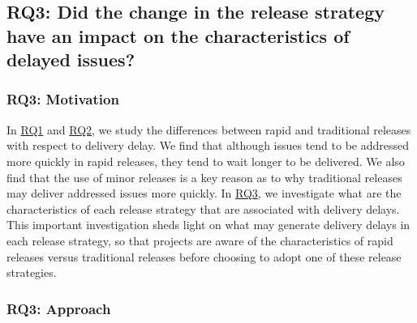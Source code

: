 
\subsection{RQ3: Did the change in the release strategy have an impact on
the characteristics of delayed issues?}\label{ch5:rq3} 

\subsubsection*{RQ3: Motivation}

In \hyperref[ch5:rq1]{RQ1} and \hyperref[ch5:rq2]{RQ2}, we study the differences
between rapid and traditional releases with respect to delivery delay. We find
that although issues tend to be addressed more quickly in rapid releases, they
tend to wait longer to be delivered. We also find that the use of minor releases
is a key reason as to why traditional releases may deliver addressed issues more
quickly. In \hyperref[ch4:rq3]{RQ3}, we investigate what are the characteristics
of each release strategy that are associated with delivery delays. This
important investigation sheds light on what may generate delivery delays in each
release strategy, so that projects are aware of the characteristics of rapid
releases versus traditional releases before choosing to adopt one of these
release strategies. 

\subsubsection*{RQ3: Approach}

